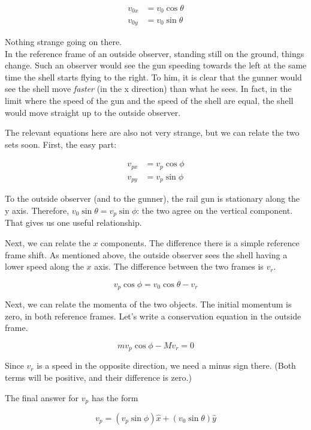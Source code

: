 \documentclass[8.01x]{subfiles}
\begin{document}
\begin{align}
v_{0x} &= v_0 \cos \theta\\
v_{0y} &= v_0 \sin \theta
\end{align}

Nothing strange going on there.\\
In the reference frame of an outside observer, standing still on the ground, things change. Such an observer would see the gun speeding towards the left at the same time the shell starts flying to the right. To him, it is clear that the gunner would see the shell move \emph{faster} (in the x direction) than what he sees. In fact, in the limit where the speed of the gun and the speed of the shell are equal, the shell would move straight up to the outside observer.

The relevant equations here are also not very strange, but we can relate the two sets soon. First, the easy part:

\begin{align}
v_{px} &= v_p \cos \phi\\
v_{py} &= v_p \sin \phi
\end{align}

To the outside observer (and to the gunner), the rail gun is stationary along the y axis. Therefore, $v_0 \sin \theta = v_p \sin \phi$: the two agree on the vertical component. That gives us one useful relationship.

Next, we can relate the $x$ components. The difference there is a simple reference frame shift. As mentioned above, the outside observer sees the shell having a lower speed along the $x$ axis. The difference between the two frames is $v_r$.

\begin{equation}
v_p \cos \phi = v_0 \cos \theta - v_r
\end{equation}

Next, we can relate the momenta of the two objects. The initial momentum is zero, in both reference frames. Let's write a conservation equation in the outside frame.

\begin{equation}
m v_p \cos \phi - M v_r = 0
\end{equation}

Since $v_r$ is a speed in the opposite direction, we need a minus sign there. (Both terms will be positive, and their difference is zero.)

The final answer for $v_p$ has the form

\begin{equation}
v_p = (v_p \sin \phi) \hat{x} + (v_0 \sin \theta) \hat{y}
\end{equation}
\end{document}
